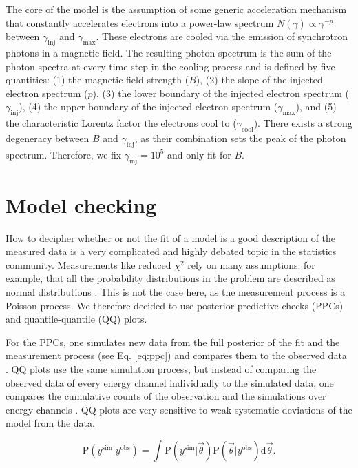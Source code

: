 \documentclass{aa}
\begin{document}
The core of the model is the assumption of some generic acceleration mechanism that constantly accelerates electrons into a power-law spectrum $N(\gamma )\propto \gamma^{-p}$ between $\gamma_{\textrm{inj}}$ and $\gamma_{\textrm{max}}$. These electrons are cooled via the emission of synchrotron photons in a magnetic field. The resulting photon spectrum is the sum of the photon spectra at every time-step in the cooling process and is defined by five quantities: (1) the magnetic field strength ($B$), (2) the slope of the injected electron spectrum ($p$), (3) the lower boundary of the injected electron spectrum ($\gamma_{\mathrm{inj}}$), (4) the upper boundary of the injected electron spectrum ($\gamma_{\mathrm{max}}$), and (5) the characteristic Lorentz factor the electrons cool to ($\gamma_{\mathrm{cool}}$). There exists a strong degeneracy between $B$ and $\gamma_{\mathrm{inj}}$, as their combination sets the peak of the photon spectrum. Therefore, we fix $\gamma_{\mathrm{inj}}=10^{5}$ and only fit for $B$.

\section{Model checking}
\label{PPC}
How to decipher whether or not the fit of a model is a good description of the measured data is a very complicated and highly debated  topic in the statistics community. Measurements like reduced $\chi^{2}$ rely on many assumptions; for example, that all the probability distributions in the problem are described as normal distributions \citep{dosanddonts}. This is not the case here, as the measurement process is a Poisson process. We therefore decided to use posterior predictive checks (PPCs) and quantile-quantile (QQ) plots.

For the PPCs, one simulates new data from the full posterior of the fit and the measurement process (see Eq. \ref{eq:ppc}) and compares them to the observed data \citep{ppc}. QQ plots use the same simulation process, but instead of comparing the observed data of every energy channel individually to the simulated data, one compares the cumulative counts of the observation and the simulations over energy channels  \citep{QQ}. QQ plots are very sensitive to weak systematic deviations of the model from the data.

\begin{equation}
  \textrm{P}(y^{\textrm{sim}}|y^{\textrm{obs}}) = \int \textrm{P}(y^{\textrm{sim}}|\vec{\theta}) \textrm{P}(\vec{\theta}|y^{\textrm{obs}}) \mathrm{d}\vec{\theta}
  \label{eq:ppc}
.\end{equation}
\end{document}

